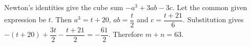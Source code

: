 Newton's identities give the cube sum $-a^3+3ab-3c$. Let the common given expression be $t$. Then $a^3=t+20$, $ab=\dfrac{t}{2}$ and $c=\dfrac{t+21}{6}$. Substitution gives $-(t+20)+\dfrac{3t}{2}-\dfrac{t+21}{2}=-\dfrac{61}{2}$. Therefore $\boxed{m+n=63}$.
